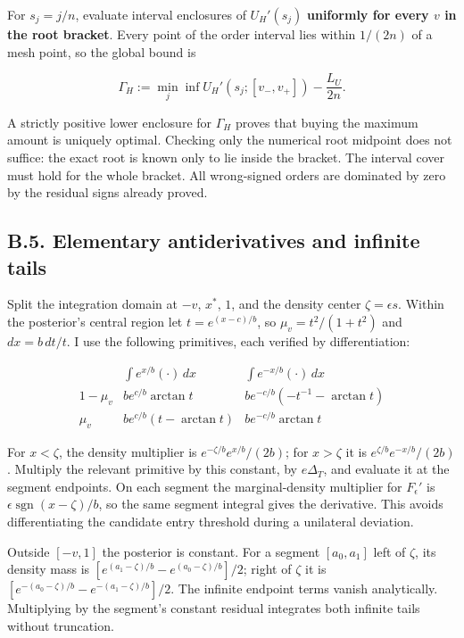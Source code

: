 \documentclass[
  11pt,
]{article}
\begin{document}
For \(s_j=j/n\), evaluate interval enclosures of \(U_H'(s_j)\)
\textbf{uniformly for every \(v\) in the root bracket}. Every point of
the order interval lies within \(1/(2n)\) of a mesh point, so the global
bound is

\[
\Gamma_H:=\min_j\inf U_H'(s_j;[v_-,v_+])-\frac{L_U}{2n}.
\tag{OA.73}\label{eq:oa-oa-73}
\]

A strictly positive lower enclosure for \(\Gamma_H\) proves that buying
the maximum amount is uniquely optimal. Checking only the numerical root
midpoint does not suffice: the exact root is known only to lie inside
the bracket. The interval cover must hold for the whole bracket. All
wrong-signed orders are dominated by zero by the residual signs already
proved.

\subsection{B.5. Elementary antiderivatives and infinite
tails}\label{oa-b-integrals}

Split the integration domain at \(-v\), \(x^*\), \(1\), and the density
center \(\zeta=\epsilon s\). Within the posterior's central region let
\(t=e^{(x-c)/b}\), so \(\mu_v=t^2/(1+t^2)\) and \(dx=b\,dt/t\). I use
the following primitives, each verified by differentiation:

\[
\begin{array}{c|cc}
&\displaystyle\int e^{x/b}(\cdot)\,dx&\displaystyle\int e^{-x/b}(\cdot)\,dx\\[2pt]
1-\mu_v&b e^{c/b}\arctan t&b e^{-c/b}(-t^{-1}-\arctan t)\\[2pt]
\mu_v&b e^{c/b}(t-\arctan t)&b e^{-c/b}\arctan t
\end{array}
\tag{OA.74}\label{eq:oa-oa-74}
\]

For \(x<\zeta\), the density multiplier is \(e^{-\zeta/b}e^{x/b}/(2b)\);
for \(x>\zeta\) it is \(e^{\zeta/b}e^{-x/b}/(2b)\). Multiply the
relevant primitive by this constant, by \(e\Delta_T\), and evaluate it
at the segment endpoints. On each segment the marginal-density
multiplier for \(F_\epsilon'\) is
\(\epsilon\operatorname{sgn}(x-\zeta)/b\), so the same segment integral
gives the derivative. This avoids differentiating the candidate entry
threshold during a unilateral deviation.

Outside \([-v,1]\) the posterior is constant. For a segment
\([a_0,a_1]\) left of \(\zeta\), its density mass is
\([e^{(a_1-\zeta)/b}-e^{(a_0-\zeta)/b}]/2\); right of \(\zeta\) it is
\([e^{-(a_0-\zeta)/b}-e^{-(a_1-\zeta)/b}]/2\). The infinite endpoint
terms vanish analytically. Multiplying by the segment's constant
residual integrates both infinite tails without truncation.
\end{document}
